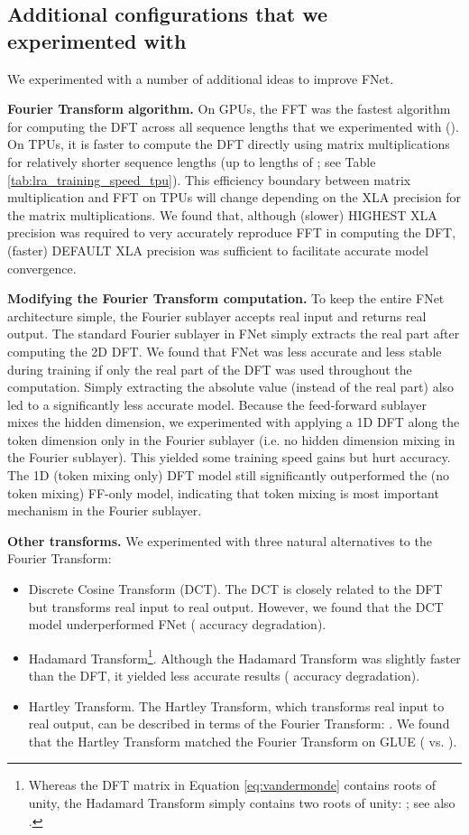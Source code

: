 \documentclass[11pt]{article}
\begin{document}
\subsection{Additional configurations that we experimented with}
\label{app:things_we_tried}

We experimented with a number of additional ideas to improve FNet.

\textbf{Fourier Transform algorithm.} On GPUs, the FFT was the fastest algorithm for computing the DFT across all sequence lengths that we experimented with (). On TPUs, it is faster to compute the DFT directly using matrix multiplications for relatively shorter sequence lengths (up to lengths of ; see Table \ref{tab:lra_training_speed_tpu}). This efficiency boundary between matrix multiplication and FFT on TPUs will change depending on the XLA precision for the matrix multiplications. We found that, although (slower) HIGHEST XLA precision was required to very accurately reproduce FFT in computing the DFT, (faster) DEFAULT XLA precision was sufficient to facilitate accurate model convergence.

\textbf{Modifying the Fourier Transform computation.} To keep the entire FNet architecture simple, the Fourier sublayer accepts real input and returns real output. The standard Fourier sublayer in FNet simply extracts the real part after computing the 2D DFT. We found that FNet was less accurate and less stable during training if only the real part of the DFT was used throughout the computation. Simply extracting the absolute value (instead of the real part) also led to a significantly less accurate model. Because the feed-forward sublayer mixes the hidden dimension, we experimented with  applying a 1D DFT along the token dimension only in the Fourier sublayer (i.e. no hidden dimension mixing in the Fourier sublayer). This yielded some training speed gains but hurt accuracy. The 1D (token mixing only) DFT model still significantly outperformed the (no token mixing) FF-only model, indicating that token mixing is most important mechanism in the Fourier sublayer.

\textbf{Other transforms.} We experimented with three natural alternatives to the Fourier Transform:
\begin{itemize}
    \item Discrete Cosine Transform (DCT). The DCT is closely related to the DFT but transforms real input to real output. However, we found that the DCT model underperformed FNet ( accuracy degradation).
    \item Hadamard Transform\footnote{Whereas the DFT matrix in Equation \eqref{eq:vandermonde} contains  roots of unity, the Hadamard Transform simply contains two roots of unity: ; see also \citet{kunz1979equivalence}.}. Although the Hadamard Transform was slightly faster than the DFT, it yielded less accurate results ( accuracy degradation).
    \item Hartley Transform. The Hartley Transform, which transforms real input to real output, can be described in terms of the Fourier Transform: . We found that the Hartley Transform matched the Fourier Transform on GLUE ( vs. ). 
\end{itemize}
\end{document}
